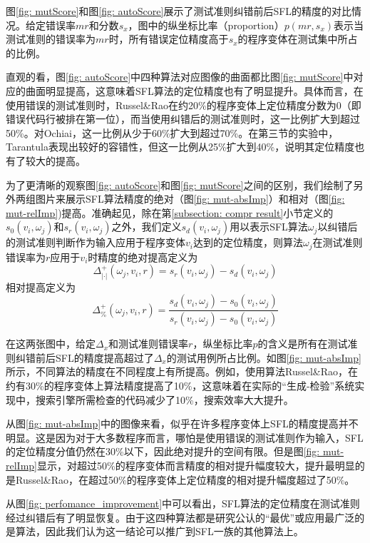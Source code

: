 图\ref{fig: mutScore}和图\ref{fig: autoScore}展示了测试准则纠错前后SFL的精度的对比情况。给定错误率$mr$和分数$s_x$，图中的纵坐标比率（proportion）$p(mr, s_x)$表示当测试准则的错误率为$mr$时，所有错误定位精度高于$s_x$的程序变体在测试集中所占的比例。

直观的看，图\ref{fig: autoScore}中四种算法对应图像的曲面都比图\ref{fig: mutScore}中对应的曲面明显提高，这意味着SFL算法的定位精度也有了明显提升。具体而言，在使用错误的测试准则时，Russel\&Rao在约20\%的程序变体上定位精度分数为$0$（即错误代码行被排在第一位），而当使用纠错后的测试准则时，这一比例扩大到超过50\%。对Ochiai，这一比例从少于60\%扩大到超过70\%。在第三节的实验中，Tarantula表现出较好的容错性，但这一比例从25\%扩大到40\%，说明其定位精度也有了较大的提高。

为了更清晰的观察图\ref{fig: autoScore}和图\ref{fig: mutScore}之间的区别，我们绘制了另外两组图片来展示SFL算法精度的绝对（图\ref{fig: mut-absImp}）和相对（图\ref{fig: mut-relImp})提高。准确起见，除在第\ref{subsection: compr result}小节定义的$s_0(v_i, \omega_j)$和$s_r(v_i, \omega_j)$之外，我们定义$s_d(v_i, \omega_j)$用以表示SFL算法$\omega_j$以纠错后的测试准则判断作为输入应用于程序变体$v_i$达到的定位精度，则算法$\omega_j$在测试准则错误率为$r$应用于$v_i$时精度的绝对提高定义为
$$
\Delta_{|\cdot|}^{+}(\omega_j, v_i, r) = s_r(v_i, \omega_j) - s_d(v_i, \omega_j)
$$
相对提高定义为
$$
\Delta_{\%}^{+}(\omega_j, v_i, r) = \frac{s_d(v_i, \omega_j) - s_0(v_i, \omega_j)}{s_r(v_i, \omega_j) - s_0(v_i, \omega_j)}
$$

在这两张图中，给定$\Delta_x$和测试准则错误率$r$，纵坐标比率$p$的含义是所有在测试准则纠错前后SFL的精度提高超过了$\Delta_x$的测试用例所占比例。如图\ref{fig: mut-absImp}所示，不同算法的精度在不同程度上有所提高。例如，使用算法Russel\&Rao，在约有30\%的程序变体上算法精度提高了10\%，这意味着在实际的“生成-检验”系统实现中，搜索引擎所需检查的代码减少了10\%，搜索效率大大提升。

从图\ref{fig: mut-absImp}中的图像来看，似乎在许多程序变体上SFL的精度提高并不明显。这是因为对于大多数程序而言，哪怕是使用错误的测试准则作为输入，SFL的定位精度分值仍然在30\%以下，因此绝对提升的空间有限。但是图\ref{fig: mut-relImp}显示，对超过50\%的程序变体而言精度的相对提升幅度较大，提升最明显的是Russel\&Rao，在超过50\%的程序变体上定位精度的相对提升幅度超过了50\%。

从图\ref{fig: perfomance_improvement}中可以看出，SFL算法的定位精度在测试准则经过纠错后有了明显恢复。由于这四种算法都是研究公认的“最优”或应用最广泛的是算法，因此我们认为这一结论可以推广到SFL一族的其他算法上。

